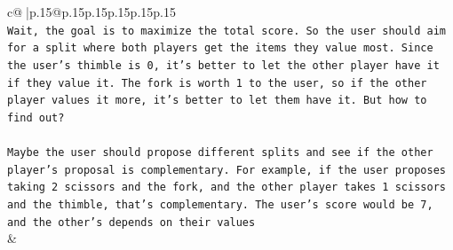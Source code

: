 \documentclass{article}
\begin{document}
{\begin{supertabular}{c@{$\;$}|p{.15\linewidth}@{}p{.15\linewidth}p{.15\linewidth}p{.15\linewidth}p{.15\linewidth}p{.15\linewidth}}
{{{\\ 
\texttt{Wait, the goal is to maximize the total score. So the user should aim for a split where both players get the items they value most. Since the user's thimble is 0, it's better to let the other player have it if they value it. The fork is worth 1 to the user, so if the other player values it more, it's better to let them have it. But how to find out?} \\
\\ 
\texttt{Maybe the user should propose different splits and see if the other player's proposal is complementary. For example, if the user proposes taking 2 scissors and the fork, and the other player takes 1 scissors and the thimble, that's complementary. The user's score would be 7, and the other's depends on their values} \\
            }
        }
    }
    & \\ \\


\end{supertabular}}
\end{document}
